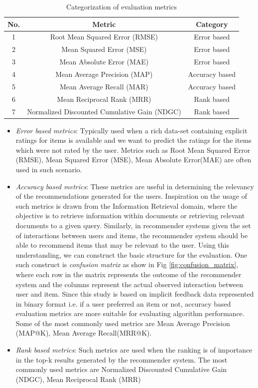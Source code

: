 \begin{table}[h!]
\centering
\begin{tabular}{|c| c| c|} 
 \hline 
 No. & Metric & Category\\ [0.5ex] 
 \hline \hline
 1 & Root Mean Squared Error (RMSE) & Error based \\ 
 \hline
 2 & Mean Squared Error (MSE) & Error based \\ 
 \hline
 3 & Mean Absolute Error (MAE) & Error based \\ 
 \hline
 4 & Mean Average Precision (MAP) & Accuracy based \\ 
 \hline
 5 & Mean Average Recall (MAR) & Accuracy based \\
 \hline
 6 & Mean Reciprocal Rank (MRR)  & Rank based \\ 
 \hline
 7 & Normalized Discounted Cumulative Gain (NDGC) & Rank based \\ 
 \hline
\end{tabular}
\caption{Categorization of evaluation metrics}
\label{table:1}
\end{table}

\begin{itemize}
	\item \textit{Error based metrics}: Typically used when a rich data-set containing explicit ratings for items is available and we want to predict the ratings for the items which were not rated by the user. Metrics such as Root Mean Squared Error (RMSE), Mean Squared Error (MSE), Mean Absolute Error(MAE) are often used in such scenario. 
	\item \textit{Accuracy based metrics}: These metrics are useful in determining the relevancy of the recommendations generated for the users. Inspiration on the usage of such metrics is drawn from the Information Retrieval domain, where the objective is to retrieve information within documents or retrieving relevant documents to a given query. Similarly, in recommender systems given the set of interactions between users and items, the recommender system should be able to recommend items that may be relevant to the user. Using this understanding, we can construct the basic structure for the evaluation. One such construct is \textit{confusion matrix} as show in Fig \ref{fig:confusion_matrix}, where each row in the matrix represents the outcome of the recommender system and the columns represent the actual observed interaction between user and item. Since this study is based on implicit feedback data represented in binary format i.e. if a user preferred an item or not, accuracy based evaluation metrics are more suitable for evaluating algorithm performance. Some of the most commonly used metrics are Mean Average Precision (MAP@K), Mean Average Recall(MRR@K).
	
	\item \textit{Rank based metrics}: Such metrics are used when the ranking is of importance in the top-k results generated by the recommender system. The most commonly used metrics are Normalized Discounted Cumulative Gain (NDGC), Mean Reciprocal Rank (MRR)
\end{itemize} \\
\par

